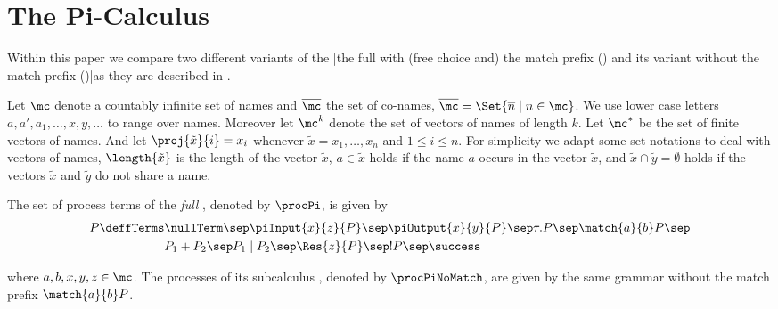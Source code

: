 \documentclass[]{article}
\begin{document}
\section{The Pi-Calculus}
\label{sec:processCalculi}

Within this paper we compare two different variants of the \piCal|the full \piCal with (free choice and) the match prefix (\piT) and its variant without the match prefix (\piNM)|as they are described \eg in \cite{milnerParrowWalker92,Milner1999}.

Let $ \mc $ denote a countably infinite set of names and $ \overline{\mc} $ the set of co-names, \ie $ \overline{\mc} = \Set{ \overline{n} \mid n \in \mc } $. We use lower case letters $ a, a', a_1, \ldots, x, y, \ldots $ to range over names.
Moreover let $ \mc^k $ denote the set of vectors of names of length $ k $. Let $ \mc^* $ be the set of finite vectors of names. And let $ \proj{\tilde{x}}{i} = x_i $ whenever $ \tilde{x} = x_1, \ldots, x_n $ and $ 1 \leq i \leq n $.
For simplicity we adapt some set notations to deal with vectors of names, \eg $ \length{\tilde{x}} $ is the length of the vector $ \tilde{x} $, $ a \in \tilde{x} $ holds if the name $ a $ occurs in the vector $ \tilde{x} $, and $ \tilde{x} \cap \tilde{y} = \emptyset $ holds if the vectors $ \tilde{x} $ and $ \tilde{y} $ do not share a name.

\begin{definition}[Syntax]
	The set of process terms of the \emph{full \piCal}, denoted by $ \procPi $, is given by
	\begin{align*}
		P \deffTerms & \nullTerm \sep \piInput{x}{z}{P} \sep \piOutput{x}{y}{P} \sep \tau.P \sep \match{a}{b}P \sep\\
		& P_1 + P_2 \sep P_1 \mid P_2 \sep \Res{z}{P} \sep !P \sep \success
	\end{align*}
	
	\noindent
	where $ a, b, x, y, z \in \mc $.
	The processes of its subcalculus \piNM, denoted by $ \procPiNoMatch $, are given by the same grammar without the match prefix $ \match{a}{b}P $.
\end{definition}
\end{document}
